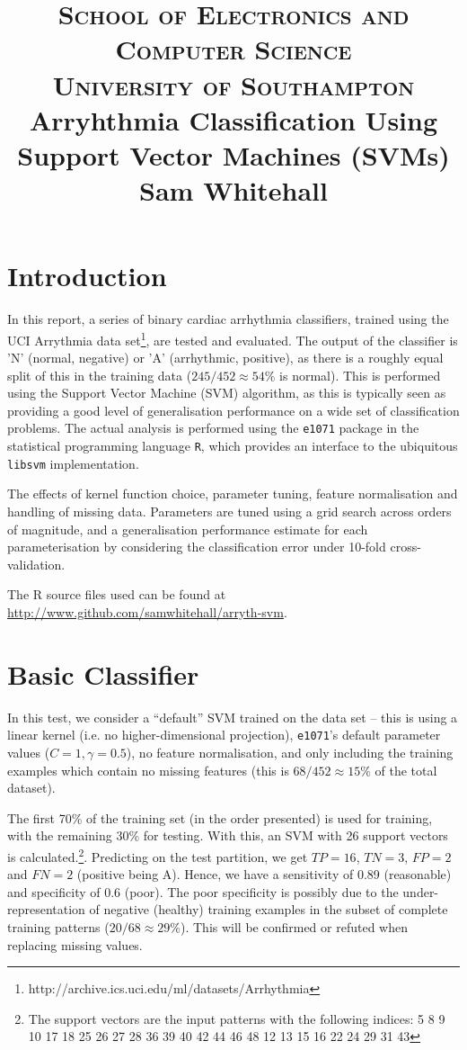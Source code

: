 \documentclass[paper=a4, fontsize=11pt]{scrartcl}
\title{
		\vspace{-1in} 	
		\usefont{OT1}{bch}{b}{n}
		\normalfont \normalsize \textsc{School of Electronics and Computer Science
		\\University of Southampton} \\ [25pt]
		\vspace{-0.2in} 
		\huge Arryhthmia Classification Using Support Vector Machines (SVMs)  \\
		\vspace{0.1in} 
		\large{Sam Whitehall}
		\vspace{-0.8in} 
}
\date{}
\numberwithin{equation}{section}
\numberwithin{figure}{section}
\numberwithin{table}{section}
\begin{document}
\maketitle

\fancyhead[L]{}
\fancyhead[R]{}														

\section{Introduction} 

In this report, a series of  binary cardiac arrhythmia classifiers, trained
using the UCI Arrythmia data
set\footnote{http://archive.ics.uci.edu/ml/datasets/Arrhythmia}, are tested and
evaluated. The output of the classifier is 'N' (normal, negative) or 'A'
(arrhythmic, positive), as there is a roughly equal split of this in the
training data ($245/452 \approx 54\%$ is normal).  This is performed using the
Support Vector Machine (SVM) algorithm, as this is typically seen as providing
a good level of generalisation performance on a wide set of classification
problems. The actual analysis is performed using the \texttt{e1071} package in
the statistical programming language \texttt{R}, which provides an interface to
the ubiquitous \texttt{libsvm} implementation. 

The effects of kernel function choice, parameter tuning, feature normalisation
and handling of missing data. Parameters are tuned using a grid search across
orders of magnitude, and a generalisation performance estimate for each
parameterisation by considering the classification error under 10-fold
cross-validation.

The R source files used can be found at
\url{http://www.github.com/samwhitehall/arryth-svm}.

\section{Basic Classifier}

In this test, we consider a ``default'' SVM trained on the data set -- this is
using a linear kernel (i.e. no higher-dimensional projection), \texttt{e1071}'s
default parameter values ($C=1, \gamma=0.5$), no feature normalisation, and
only including the training examples which contain no missing features (this is
$68/452 \approx 15\%$ of the total dataset).

The first 70\% of the training set (in the order presented) is used for
training, with the remaining 30\% for testing. With this, an SVM with 26
support vectors is calculated.\footnote{The support vectors are the input
patterns with the following indices: 5  8  9 10 17 18 25 26 27 28 36 39 40 42
44 46 48 12 13 15 16 22 24
29 31 43}. Predicting on the test partition, we get $TP=16$, $TN=3$, $FP=2$ and
   $FN=2$ (positive being A). Hence, we have a sensitivity of 0.89 (reasonable)
   and specificity of
0.6 (poor). The poor specificity is possibly due to the under-representation of
  negative (healthy) training examples in the subset of complete training
  patterns ($20 / 68 \approx 29\%$). This will be confirmed or refuted when
  replacing missing values.
\end{document}
